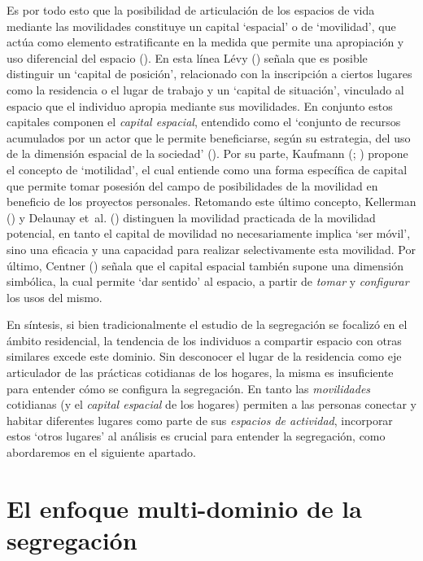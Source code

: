 \documentclass[
  spanish,
  a4paper,%
  chapterprefix=true,%
  DIV=calc,%
  twoside]{scrbook}%
\begin{document}
Es por todo esto que la posibilidad de articulación de los espacios de
vida mediante las movilidades constituye un capital `espacial' o de
`movilidad', que actúa como elemento estratificante en la medida que
permite una apropiación y uso diferencial del espacio (). En
esta línea Lévy () señala que es posible distinguir un `capital de
posición', relacionado con la inscripción a ciertos lugares como la
residencia o el lugar de trabajo y un `capital de situación', vinculado
al espacio que el individuo apropia mediante sus movilidades. En
conjunto estos capitales componen el \emph{capital espacial}, entendido como
el `conjunto de recursos acumulados por un actor que le permite
beneficiarse, según su estrategia, del uso de la dimensión espacial de
la sociedad' (). Por su parte, Kaufmann (; ) propone el concepto de `motilidad', el cual entiende como
una forma específica de capital que permite tomar posesión del campo de
posibilidades de la movilidad en beneficio de los proyectos personales.
Retomando este último concepto, Kellerman () y Delaunay et~al. ()
distinguen la movilidad practicada de la movilidad potencial, en tanto
el capital de movilidad no necesariamente implica `ser móvil', sino una
eficacia y una capacidad para realizar selectivamente esta movilidad.
Por último, Centner () señala que el capital espacial también supone
una dimensión simbólica, la cual permite `dar sentido' al espacio, a
partir de \emph{tomar} y \emph{configurar} los usos del mismo.

En síntesis, si bien tradicionalmente el estudio de la segregación se
focalizó en el ámbito residencial, la tendencia de los individuos a
compartir espacio con otras similares excede este dominio. Sin
desconocer el lugar de la residencia como eje articulador de las
prácticas cotidianas de los hogares, la misma es insuficiente para
entender cómo se configura la segregación. En tanto las \emph{movilidades}
cotidianas (y el \emph{capital espacial} de los hogares) permiten a las
personas conectar y habitar diferentes lugares como parte de sus
\emph{espacios de actividad}, incorporar estos `otros lugares' al análisis es
crucial para entender la segregación, como abordaremos en el siguiente
apartado.

\section{El enfoque multi-dominio de la segregación}\label{lit-multidomain}
\end{document}
